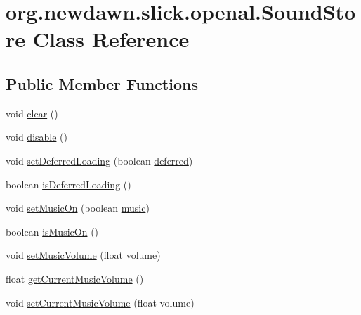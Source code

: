 \hypertarget{classorg_1_1newdawn_1_1slick_1_1openal_1_1_sound_store}{}\section{org.\+newdawn.\+slick.\+openal.\+Sound\+Store Class Reference}
\label{classorg_1_1newdawn_1_1slick_1_1openal_1_1_sound_store}
\subsection*{Public Member Functions}
\begin{DoxyCompactItemize}
\item 
void \mbox{\hyperlink{classorg_1_1newdawn_1_1slick_1_1openal_1_1_sound_store_a5649b549cd9d0f1b745622fbdac13430}{clear}} ()
\item 
void \mbox{\hyperlink{classorg_1_1newdawn_1_1slick_1_1openal_1_1_sound_store_a089efb95bf3b186a6f9c8fdf28c40f13}{disable}} ()
\item 
void \mbox{\hyperlink{classorg_1_1newdawn_1_1slick_1_1openal_1_1_sound_store_aaad12ea85c393689fdd9f029ecfba995}{set\+Deferred\+Loading}} (boolean \mbox{\hyperlink{classorg_1_1newdawn_1_1slick_1_1openal_1_1_sound_store_a19c18b8305a40c99b51cde881a6f1d32}{deferred}})
\item 
boolean \mbox{\hyperlink{classorg_1_1newdawn_1_1slick_1_1openal_1_1_sound_store_ae76241f855bad0a9101682ad5f93475d}{is\+Deferred\+Loading}} ()
\item 
void \mbox{\hyperlink{classorg_1_1newdawn_1_1slick_1_1openal_1_1_sound_store_a432fd6f8e8dfa346013d313fa63fc44c}{set\+Music\+On}} (boolean \mbox{\hyperlink{classorg_1_1newdawn_1_1slick_1_1openal_1_1_sound_store_a7e15ee371935f6d530e4481ac9e2bd7e}{music}})
\item 
boolean \mbox{\hyperlink{classorg_1_1newdawn_1_1slick_1_1openal_1_1_sound_store_a2f3eb7c825a16c900b2caee584fff9b8}{is\+Music\+On}} ()
\item 
void \mbox{\hyperlink{classorg_1_1newdawn_1_1slick_1_1openal_1_1_sound_store_a004456c4757e412245ae6f1dbb0319d1}{set\+Music\+Volume}} (float volume)
\item 
float \mbox{\hyperlink{classorg_1_1newdawn_1_1slick_1_1openal_1_1_sound_store_a36021d810d6956ef906c1083f02bed2b}{get\+Current\+Music\+Volume}} ()
\item 
void \mbox{\hyperlink{classorg_1_1newdawn_1_1slick_1_1openal_1_1_sound_store_ab3507f6a2b2b1e50d20c80baec859323}{set\+Current\+Music\+Volume}} (float volume)

\end{DoxyCompactItemize}
